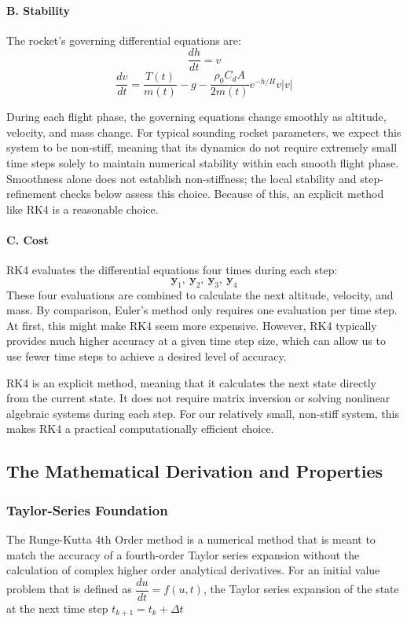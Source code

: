 \documentclass{article}
\begin{document}
\paragraph{B. Stability}
The rocket's governing differential equations are:
\[\frac{dh}{dt} = v\]
\[\frac{dv}{dt} = \frac{T(t)}{m(t)} - g - \frac{\rho_0 C_d A}{2m(t)} e^{-h/H}v|v|\]

During each flight phase, the governing equations change smoothly as altitude, velocity, and mass change.  For typical sounding rocket parameters, we expect this system to be non-stiff, meaning that its dynamics do not require extremely small time steps solely to maintain numerical stability within each smooth flight phase. Smoothness alone does not establish non-stiffness; the local stability and step-refinement checks below assess this choice. Because of this, an explicit method like RK4 is a reasonable choice. 

\paragraph{C. Cost}
RK4 evaluates the differential equations four times during each step:
\[\boxed{\mathbf{y}_1,\ \mathbf{y}_2,\ \mathbf{y}_3,\ \mathbf{y}_4}\]
These four evaluations are combined to calculate the next altitude, velocity, and mass. By comparison, Euler's method only requires one evaluation per time step. At first, this might make RK4 seem more expensive. However, RK4 typically provides much higher accuracy at a given time step size, which can allow us to use fewer time steps to achieve a desired level of accuracy. 


RK4 is an explicit method, meaning that it calculates the next state directly from the current state. It does not require matrix inversion or solving nonlinear algebraic systems during each step. For our relatively small, non-stiff system, this makes RK4 a practical computationally efficient choice. 


\subsection{The Mathematical Derivation and Properties} %

\subsubsection{Taylor-Series Foundation}%
The Runge-Kutta 4th Order method is a numerical method that is meant to match the accuracy of a fourth-order Taylor series expansion without the calculation of complex higher order analytical derivatives. For an initial value problem that is defined as $\dfrac{du}{dt} = f\left(u,t\right)$, the Taylor series expansion of the state at the next time step $t_{k+1}=t_k + \Delta t $
\end{document}
